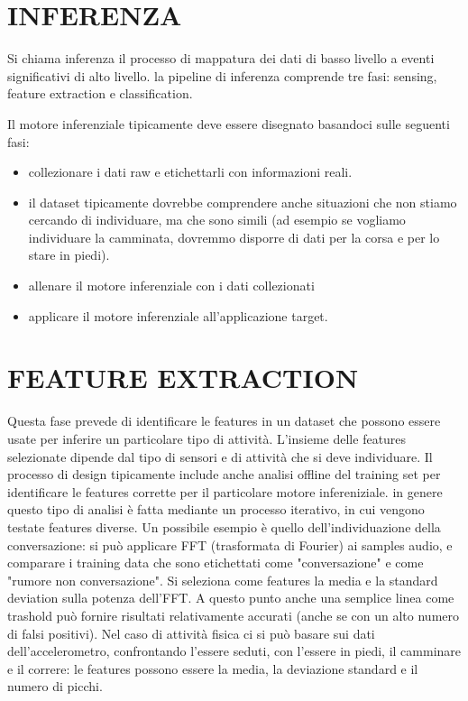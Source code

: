\section{INFERENZA}
Si chiama inferenza il processo di mappatura dei dati di basso livello a eventi 
significativi di alto livello.
la pipeline di inferenza comprende tre fasi: sensing, feature extraction e
classification.

Il motore inferenziale tipicamente deve essere disegnato basandoci sulle
seguenti fasi:
\begin{itemize}
\item collezionare i dati raw e etichettarli con informazioni reali.
\item il dataset tipicamente dovrebbe comprendere anche situazioni che non
stiamo cercando di individuare, ma che sono simili (ad esempio se vogliamo
individuare la camminata, dovremmo disporre di dati per la corsa e per lo stare
in piedi).
\item allenare il motore inferenziale con i dati collezionati
\item applicare il motore inferenziale all'applicazione target.
\end{itemize}

\section{FEATURE EXTRACTION}
Questa fase prevede di identificare le features in un dataset che possono essere
usate per inferire un particolare tipo di attività.
L'insieme delle features selezionate dipende dal tipo di sensori e di attività
che si deve individuare. Il processo di design tipicamente include anche analisi
offline del training set per identificare le features corrette per il
particolare motore infereniziale. in genere questo tipo di analisi è fatta
mediante un processo iterativo, in cui vengono testate features diverse.
Un possibile esempio è quello dell'individuazione della conversazione: si può
applicare FFT (trasformata di Fourier) ai samples audio, e comparare i training
data che sono etichettati come "conversazione" e come "rumore non
conversazione". Si seleziona come features la media e la standard deviation
sulla potenza dell'FFT. A questo punto anche una semplice linea come trashold
può fornire risultati relativamente accurati (anche se con un alto numero di
falsi positivi).
Nel caso di attività fisica ci si può basare sui dati dell'accelerometro,
confrontando l'essere seduti, con l'essere in piedi, il camminare e il correre:
le features possono essere la media, la deviazione standard e il numero di
picchi.

